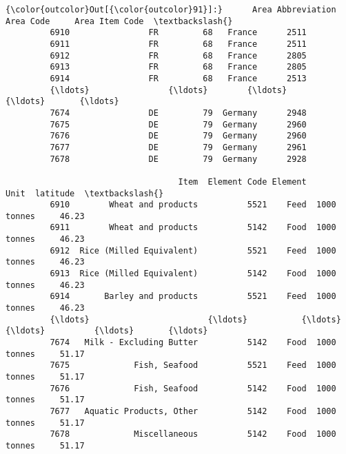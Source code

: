 \documentclass[11pt]{article}
\begin{document}
\begin{Verbatim}[commandchars=\\\{\}]
{\color{outcolor}Out[{\color{outcolor}91}]:}      Area Abbreviation  Area Code     Area Item Code  \textbackslash{}
         6910                FR         68   France      2511   
         6911                FR         68   France      2511   
         6912                FR         68   France      2805   
         6913                FR         68   France      2805   
         6914                FR         68   France      2513   
         {\ldots}                {\ldots}        {\ldots}      {\ldots}       {\ldots}   
         7674                DE         79  Germany      2948   
         7675                DE         79  Germany      2960   
         7676                DE         79  Germany      2960   
         7677                DE         79  Germany      2961   
         7678                DE         79  Germany      2928   
         
                                   Item  Element Code Element         Unit  latitude  \textbackslash{}
         6910        Wheat and products          5521    Feed  1000 tonnes     46.23   
         6911        Wheat and products          5142    Food  1000 tonnes     46.23   
         6912  Rice (Milled Equivalent)          5521    Feed  1000 tonnes     46.23   
         6913  Rice (Milled Equivalent)          5142    Food  1000 tonnes     46.23   
         6914       Barley and products          5521    Feed  1000 tonnes     46.23   
         {\ldots}                        {\ldots}           {\ldots}     {\ldots}          {\ldots}       {\ldots}   
         7674   Milk - Excluding Butter          5142    Food  1000 tonnes     51.17   
         7675             Fish, Seafood          5521    Feed  1000 tonnes     51.17   
         7676             Fish, Seafood          5142    Food  1000 tonnes     51.17   
         7677   Aquatic Products, Other          5142    Food  1000 tonnes     51.17   
         7678             Miscellaneous          5142    Food  1000 tonnes     51.17   
         

\end{Verbatim}
\end{document}
